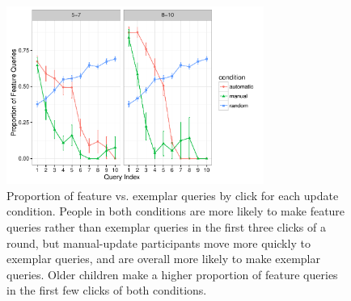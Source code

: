 \documentclass[man,floatsintext]{apa6}
\begin{document}
\begin{figure}[!h]
  \centering
  \includegraphics[width=0.75\textwidth]{figures/proportion_feat_queries_by_click} %
  \vspace{-.1cm}
  \caption{Proportion of feature vs. exemplar queries by click for each update condition. 
People in both conditions are more likely to make feature queries rather than 
exemplar queries in the first three clicks of a round, but manual-update participants 
move more quickly to exemplar queries, and are overall more likely to make 
exemplar queries. Older children make a higher proportion of feature queries in the first few clicks of both conditions.}
  \label{fig:query-prop-click}
  \vspace{-.1cm}
\end{figure} 



\end{document}
